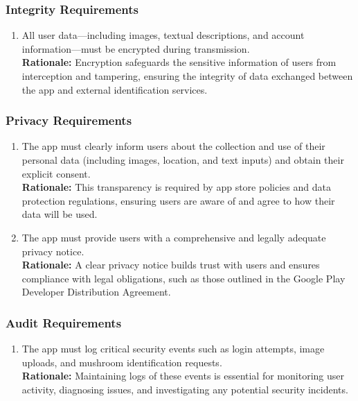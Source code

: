 \documentclass[]{article}
\begin{document}
\begin{enumerate}[{\bf BE1.}]
\subsubsection{Integrity Requirements}
\label{ssub:integrity_requirements}
\begin{enumerate}[{SR-INT}1. ]
	\item All user data—including images, textual descriptions, and account information—must be encrypted during transmission.\\
	\textbf{Rationale:} Encryption safeguards the sensitive information of users from interception and tampering, ensuring the integrity of data exchanged between the app and external identification services.
\end{enumerate}

\subsubsection{Privacy Requirements}
\label{ssub:privacy_requirements}
\begin{enumerate}[{SR-P}1. ]
	\item The app must clearly inform users about the collection and use of their personal data (including images, location, and text inputs) and obtain their explicit consent.\\
	\textbf{Rationale:} This transparency is required by app store policies and data protection regulations, ensuring users are aware of and agree to how their data will be used.
	\item The app must provide users with a comprehensive and legally adequate privacy notice.\\
	\textbf{Rationale:} A clear privacy notice builds trust with users and ensures compliance with legal obligations, such as those outlined in the Google Play Developer Distribution Agreement.
\end{enumerate}

\subsubsection{Audit Requirements}
\label{ssub:audit_requirements}
\begin{enumerate}[{SR-AU}1. ]
	\item The app must log critical security events such as login attempts, image uploads, and mushroom identification requests.\\
	\textbf{Rationale:} Maintaining logs of these events is essential for monitoring user activity, diagnosing issues, and investigating any potential security incidents.
\end{enumerate}


\end{enumerate}
\end{document}
